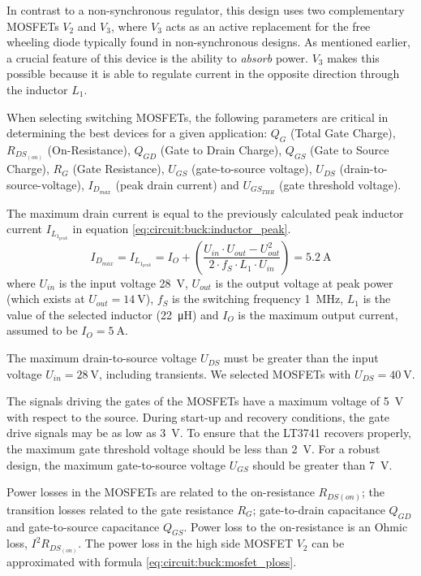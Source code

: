 In contrast to a non-synchronous regulator, this design uses  two  complementary
MOSFETs $V_2$ and $V_3$, where $V_3$ acts as an active replacement for the  free
wheeling diode typically found in non-synchronous designs. As mentioned earlier,
a crucial feature of  this  device  is the ability to \emph{absorb} power. $V_3$
makes  this  possible  because  it  is  able to regulate current in the opposite
direction through the inductor $L_1$.

When  selecting  switching  MOSFETs,  the  following  parameters are critical in
determining the best devices for a given application: $Q_G$ (Total Gate Charge),
$R_{DS_{(on)}}$ (On-Resistance), $Q_{GD}$ (Gate to Drain Charge), $Q_{GS}$ (Gate
to Source  Charge),  $R_G$ (Gate Resistance), $U_{GS}$ (gate-to-source voltage),
$U_{DS}$  (drain-to-source-voltage),  $I_{D_{max}}$  (peak  drain  current)  and
$U_{GS_{THR}}$ (gate threshold voltage).

The maximum drain current is equal to the previously  calculated  peak  inductor
current $I_{L_{1_{peak}}}$ in equation \ref{eq:circuit:buck:inductor_peak}.
\begin{equation}
    I_{D_{max}} = I_{L_{1_{peak}}} = I_O + \left(\frac{U_{in}\cdot U_{out} - U_{out}^2}{2\cdot f_S \cdot L_1 \cdot U_{in}}\right) = \SI{5.2}{\ampere}
    \label{eq:circuit:buck:mosfet_id}
\end{equation}
where $U_{in}$ is the  input  voltage  \SI{28}{\volt},  $U_{out}$  is the output
voltage at peak power (which exists at $U_{out} = \SI{14}{\volt}$), $f_S$ is the
switching  frequency  \SI{1}{\mega\hertz},  $L_1$  is the value of the  selected
inductor (\SI{22}{\micro\henry})  and  $I_O$  is  the  maximum  output  current,
assumed to be $I_O = \SI{5}{\ampere}$.

The  maximum drain-to-source voltage $U_{DS}$ must be  greater  than  the  input
voltage $U_{in} = \SI{28}{\volt}$,  including  transients.  We  selected MOSFETs
with $U_{DS} = \SI{40}{\volt}$.

The  signals  driving  the  gates  of  the MOSFETs have  a  maximum  voltage  of
\SI{5}{\volt}  with   respect  to  the  source.  During  start-up  and  recovery
conditions, the gate drive signals  may  be  as  low as \SI{3}{\volt}. To ensure
that the LT3741 recovers properly, the  maximum gate threshold voltage should be
less than \SI{2}{\volt}. For a robust design, the maximum gate-to-source voltage
$U_{GS}$ should be greater than \SI{7}{\volt}.

Power losses in the MOSFETs are related to the on-resistance $R_{DS{(on)}}$; the
transition  losses  related  to  the  gate   resistance   $R_G$;   gate-to-drain
capacitance  $Q_{GD}$ and gate-to-source capacitance $Q_{GS}$. Power loss to the
on-resistance is an  Ohmic loss, $I^2 R_{DS_{(on)}}$. The power loss in the high
side     MOSFET     $V_2$      can      be     approximated     with     formula
\ref{eq:circuit:buck:mosfet_ploss}.

